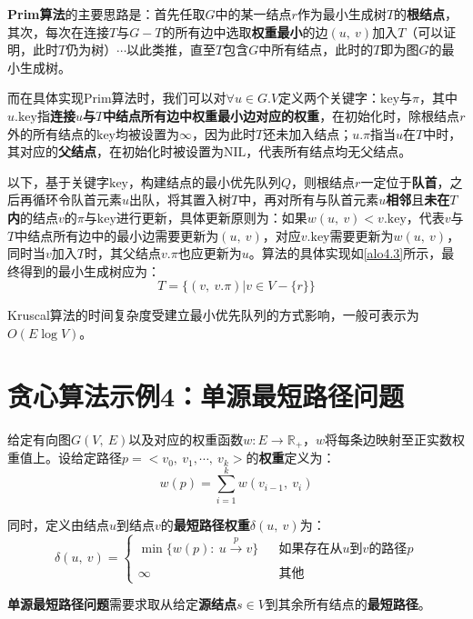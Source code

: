 \documentclass[12pt,a4paper,violet,oneside]{bbe}
\begin{document}
\textbf{Prim算法}的主要思路是：首先任取$G$中的某一结点$r$作为最小生成树$T$的\textbf{根结点}，其次，每次在连接$T$与$G-T$的所有边中选取\textbf{权重最小}的边$(u,~v)$加入$T$（可以证明，此时$T$仍为树）$\cdots$以此类推，直至$T$包含$G$中所有结点，此时的$T$即为图$G$的最小生成树。

而在具体实现Prim算法时，我们可以对$\forall u\in G.V$定义两个关键字：$\text{key}$与$\pi$，其中$u.\text{key}$指\textbf{连接$u$与$T$中结点所有边中权重最小边对应的权重}，在初始化时，除根结点$r$外的所有结点的$\text{key}$均被设置为$\infty$，因为此时$T$还未加入结点；$u.\pi$指当$u$在$T$中时，其对应的\textbf{父结点}，在初始化时被设置为$\text{NIL}$，代表所有结点均无父结点。

以下，基于关键字$\text{key}$，构建结点的最小优先队列$Q$，则根结点$r$一定位于\textbf{队首}，之后再循环令队首元素$u$出队，将其置入树$T$中，再对所有与队首元素$u$\textbf{相邻}且\textbf{未在$T$内}的结点$v$的$\pi$与$\text{key}$进行更新，具体更新原则为：如果$w(u,~v)<v.\text{key}$，代表$v$与$T$中结点所有边中的最小边需要更新为$(u,~v)$，对应$v.\text{key}$需要更新为$w(u,~v)$，同时当$v$加入$T$时，其父结点$v.\pi$也应更新为$u$。算法的具体实现如\cref{alo4.3}所示，最终得到的最小生成树应为：
$$
T=\{(v,~v.\pi)|v\in V-\{r\}\}
$$
\begin{remark}
	Kruscal算法的时间复杂度受建立最小优先队列的方式影响，一般可表示为$O(E\log V)$。
\end{remark}
\section{贪心算法示例4：单源最短路径问题}
\begin{example}
	给定有向图$G(V,~E)$以及对应的权重函数$w: E\to \mathbb{R}_+$，$w$将每条边映射至正实数权重值上。设给定路径$p=<v_0,~v_1,\cdots,~v_k>$的\textbf{权重}定义为：
	$$
	w(p)=\sum\limits_{i=1}^kw(v_{i-1},~v_i)
	$$
	
	同时，定义由结点$u$到结点$v$的\textbf{最短路径权重}$\delta(u,~v)$为：
	$$
	\delta(u,~v)=\left\{\begin{array}{lcl}
		\min\{w(p):~u\xrightarrow[]{p}v\}&&\text{如果存在从$u$到$v$的路径$p$}\\
		\infty&&\text{其他}
	\end{array}\right.
	$$
	
	\textbf{单源最短路径问题}需要求取从给定\textbf{源结点}$s\in V$到其余所有结点的\textbf{最短路径}。
\end{example}
\end{document}
